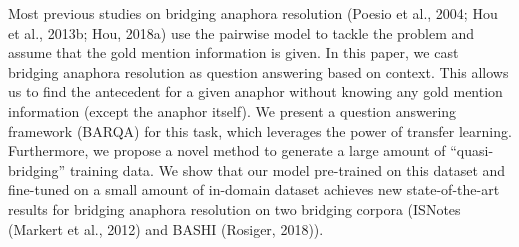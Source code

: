 Most previous studies on bridging anaphora resolution (Poesio et al., 2004; Hou et al., 2013b; Hou, 2018a) use the pairwise model to tackle the problem and assume that the gold mention information is given. In this paper, we cast bridging anaphora resolution as question answering based on context. This allows us to find the antecedent for a given anaphor without knowing any gold mention information (except the anaphor itself). We present a question answering framework (BARQA) for this task, which leverages the power of transfer learning. Furthermore, we propose a novel method to generate a large amount of ``quasi-bridging'' training data. We show that our model pre-trained on this dataset and fine-tuned on a small amount of in-domain dataset achieves new state-of-the-art results for bridging anaphora resolution on two bridging corpora (ISNotes (Markert et al., 2012) and BASHI (Rosiger, 2018)).
